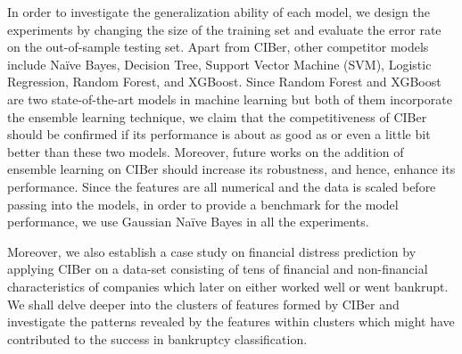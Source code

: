\documentclass[twoside,11pt]{article}
\begin{document}
In order to investigate the generalization ability of each model, we design the experiments by changing the size of the training set and evaluate the error rate on the out-of-sample testing set. Apart from CIBer, other competitor models include Na\"ive Bayes, Decision Tree, Support Vector Machine (SVM), Logistic Regression, Random Forest, and XGBoost. Since Random Forest and XGBoost are two state-of-the-art models in machine learning but both of them incorporate the ensemble learning technique, we claim that the competitiveness of CIBer should be confirmed if its performance is about as good as or even a little bit better than these two models. Moreover, future works on the addition of ensemble learning on CIBer should increase its robustness, and hence, enhance its performance. Since the features are all numerical and the data is scaled before passing into the models, in order to provide a benchmark for the model performance, we use Gaussian Na\"ive Bayes in all the experiments.

Moreover, we also establish a case study on financial distress prediction by applying CIBer on a data-set consisting of tens of financial and non-financial characteristics of companies which later on either worked well or went bankrupt. We shall delve deeper into the clusters of features formed by CIBer and investigate the patterns revealed by the features within clusters which might have contributed to the success in bankruptcy classification. 
\end{document}

